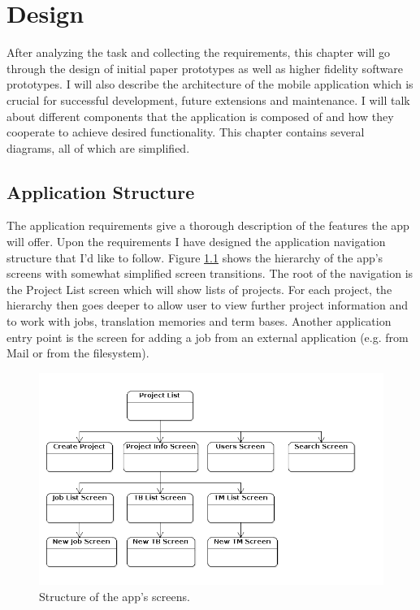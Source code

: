 
\chapter{Design}

After analyzing the task and collecting the requirements, this chapter will go through the design of initial paper prototypes as well as higher fidelity software prototypes. I will also describe the architecture of the mobile application which is crucial for successful development, future extensions and maintenance. I will talk about different components that the application is composed of and how they cooperate to achieve desired functionality. This chapter contains several diagrams, all of which are simplified.

\section{Application Structure}

The application requirements give a thorough description of the features the app will offer. Upon the requirements I have designed the application navigation structure that I'd like to follow. Figure \ref{fig:structure} shows the hierarchy of the app's screens with somewhat simplified screen transitions. The root of the navigation is the Project List screen which will show lists of projects. For each project, the hierarchy then goes deeper to allow user to view further project information and to work with jobs, translation memories and term bases. Another application entry point is the screen for adding a job from an external application (e.g. from Mail or from the filesystem).

\begin{figure}[]
	\includegraphics[width=1\textwidth]{argoUml/structure}
	\caption{Structure of the app's screens.}
	\label{fig:structure}
\end{figure}

